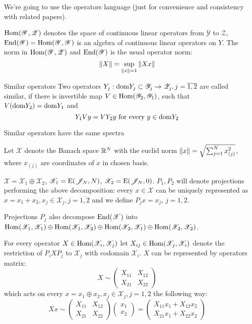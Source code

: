 \documentclass{article}
\begin{document}
We're going to use the operators language (just for convenience and consistency with related papers).

\( \mathrm{Hom}({\mathscr Y},{\mathscr Z}) \) denotes the space of continuous linear operators
from \( \mathscr Y \) to \( \mathscr Z \),
\( \mathrm{End}({\mathscr Y}) = \mathrm{Hom}({\mathscr Y},{\mathscr Y}) \) is an algebra of continuous linear operators on \( Y \).
The norm in \( \mathrm{Hom}({\mathscr Y},{\mathscr Z}) \) and \( \mathrm{End}({\mathscr Y}) \) is the usual operator norm:
\[\left\|{X}\right\| = \sup_{\left\|{x}\right\| = 1}{\left\|{X x}\right\|}\]
\begin{dfn}{Similar operators}
    Two operators \( Y_j:\mathrm{dom} {Y_j}\subset\mathscr Y_j\to\mathscr Z_j, j=\overline{1,2} \) are called similar,
    if there is invertible map \( V\in\mathrm{Hom}({\mathscr Y_2},{\mathscr Y_1}) \),
    such that \( V(\mathrm{dom} {Y_2}) = \mathrm{dom} {Y_1} \) and
    \[Y_1 V y = V Y_2 y \text{ for every } y\in\mathrm{dom} {Y_2}\]
\end{dfn}
\begin{propose}
    Similar operators have the same spectra
\end{propose}

Let \( \mathscr X \) denote the Banach space \( \mathbb{R}^N \) with the euclid norm
\( \left\|{x}\right\| = \sqrt{\sum_{j=1}^N x_{(j)}^2} \), where \( x_{(j)} \) are coordinates of \( x \) in chosen basis.

\( \mathscr X = \mathscr X_1 \oplus \mathscr X_2 \),
\( \mathscr X_1 = \mathrm{E}({\mathscr{J}_{N}}, {N}) \),
\( \mathscr X_2 = \mathrm{E}({\mathscr{J}_{N}}, {0}) \).
\( P_1, P_2 \) will denote projections performing the above decomposition:
every \( x\in\mathscr X \) can be uniquely represented as \( x = x_1 + x_2, x_j\in\mathscr X_j,j=\overline{1,2} \)
and we define \( P_j x = x_j \), \( j=\overline{1,2} \).

Projections \( P_j \) also decompose \( \mathrm{End}({\mathscr X}) \) into
\( \mathrm{Hom}({\mathscr X_1},{\mathscr X_1})
    \oplus \mathrm{Hom}({\mathscr X_1},{\mathscr X_2})
    \oplus \mathrm{Hom}({\mathscr X_2},{\mathscr X_1})
    \oplus \mathrm{Hom}({\mathscr X_2},{\mathscr X_2}) \).

For every operator \( X\in\mathrm{Hom}({\mathscr X_i},{\mathscr X_j}) \)
let \( X_{ij} \in \mathrm{Hom}({\mathscr X_j},{\mathscr X_i}) \)
denote the restriction of \( P_i X P_j \) to \( \mathscr X_j \) with codomain \( \mathscr X_i \).
\( X \) can be represented by operators matrix:
\[X \sim \begin{pmatrix}
    X_{11} & X_{12} \\
    X_{21} & X_{22}
\end{pmatrix}\]
which acts on every \( x = x_1 \oplus x_2, x_j\in\mathscr X_j,j=\overline{1,2} \) the following way:
\[
X x \sim
\begin{pmatrix}
    X_{11} & X_{12} \\
    X_{21} & X_{22}
\end{pmatrix}
\begin{pmatrix} x_1 \\ x_2 \end{pmatrix}
= \begin{pmatrix}
    X_{11} x_1 + X_{12} x_2 \\
    X_{21} x_1 + X_{22} x_2
\end{pmatrix}
\]
\end{document}
